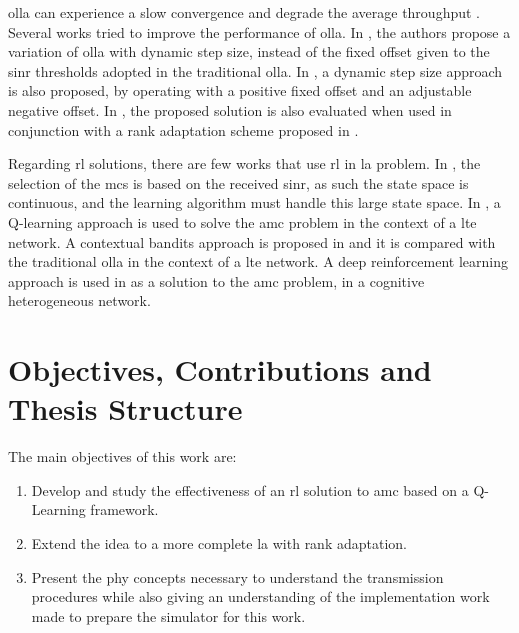 \Gls{olla} can experience a slow convergence and degrade the average throughput \cite{10.1145/3341216.3342212}.
%
Several works tried to improve the performance of \gls{olla}.
%
In \cite{Blanquez-Casado2016}, the authors propose a variation of \gls{olla} with dynamic step size, instead of the fixed offset given to the \gls{sinr} thresholds adopted in the traditional \gls{olla}.
%
In \cite{Sarret2015}, a dynamic step size approach is also proposed, by operating with a positive fixed offset and an adjustable negative offset.
%
In \cite{Sarret2015}, the proposed solution is also evaluated when used in conjunction with a rank adaptation scheme proposed in \cite{catania2015distributed}.

Regarding \gls{rl} solutions, there are few works that use \gls{rl} in \gls{la} problem.
%
In \cite{continuousState}, the selection of the \gls{mcs} is based on the received \gls{sinr}, as such the state space is continuous, and the learning algorithm must handle this large state space.
%
In \cite{bruno2014robust}, a Q-learning approach is used to solve the \gls{amc} problem in the context of a \gls{lte} network.
%
A contextual bandits approach is proposed in \cite{10.1145/3341216.3342212} and it is compared with the traditional \gls{olla} in the context of a \gls{lte} network.
%
A deep reinforcement learning approach is used in \cite{DRL_AMC} as a solution to the \gls{amc} problem, in a cognitive heterogeneous network.



\section{Objectives, Contributions and Thesis Structure}

The main objectives of this work are:
\begin{enumerate}
    \item Develop and study the effectiveness of an \gls{rl} solution to \gls{amc} based on a Q-Learning framework.
    \item Extend the idea to a more complete \gls{la} with rank adaptation.
    \item Present the \gls{phy} concepts necessary to understand the transmission procedures while also giving an understanding of the implementation work made to prepare the simulator for this work.
\end{enumerate}

